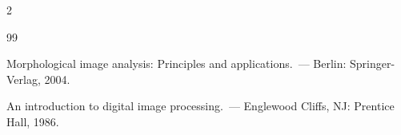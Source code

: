 \begin{multicols}{2}
{{\begin{thebibliography}{99}




Morphological image analysis: Principles and applications.~--- Berlin: Springer-Verlag, 2004.





\label{end\stat}












An introduction to digital image processing.~--- Englewood Cliffs, NJ: Prentice Hall, 1986.


 \end{thebibliography}


}


}








\end{multicols}       


